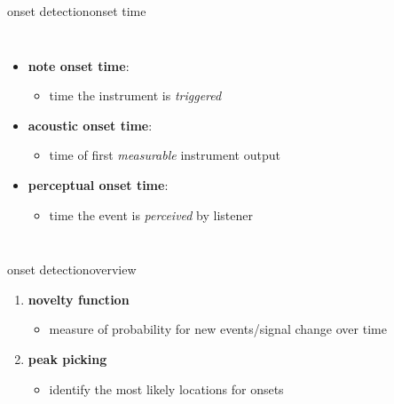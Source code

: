         \begin{frame}{onset detection}{onset time}
            \begin{columns}
                \begin{itemize}
                    \item \textbf{note onset time}: 
                        \begin{itemize}
                            \item   time the instrument is \textit{triggered}
                        \end{itemize}
                    \bigskip
                    \item \textbf{acoustic onset time}: 
                        \begin{itemize}
                            \item   time of first \textit{measurable} instrument output
                        \end{itemize}
                    \bigskip
                    \item   \textbf{perceptual onset time}:
                        \begin{itemize}
                            \item   time the event is \textit{perceived} by listener
                        \end{itemize}
                \end{itemize}
            \end{columns}
        \end{frame}

        \begin{frame}{onset detection}{overview}
            \begin{figure}
                \centering
                
            \end{figure}
            
            \begin{enumerate}
                \item<2-> 	\textbf{novelty function}
                    \begin{itemize}
                        \item	measure of probability for new events/signal change over time	
                    \end{itemize}
                
                \bigskip
                \item<3->	\textbf{peak picking}
                    \begin{itemize}
                        \item	identify the most likely locations for onsets
                    \end{itemize}
            \end{enumerate}
        \end{frame}
        
